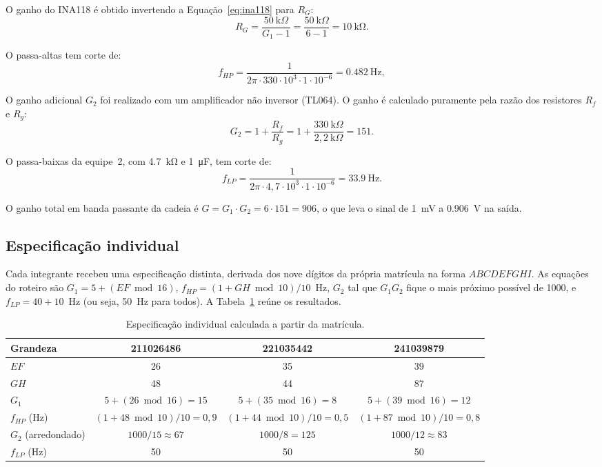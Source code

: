 \documentclass[11pt,a4paper]{article}
\begin{document}
O ganho do INA118 é obtido invertendo a Equação~\eqref{eq:ina118} para $R_G$:
\begin{equation}
R_G = \frac{50~\text{k}\Omega}{G_1 - 1} = \frac{50~\text{k}\Omega}{6 - 1} = \SI{10}{\kilo\ohm} .
\label{eq:rg_equipe}
\end{equation}

O passa-altas tem corte de:
\begin{equation}
f_{HP} = \frac{1}{2\pi \cdot 330 \cdot 10^3 \cdot 1 \cdot 10^{-6}} = \SI{0,482}{\hertz} ,
\label{eq:fhp_equipe}
\end{equation}

O ganho adicional $G_2$ foi realizado com um amplificador não inversor (TL064). O ganho é calculado puramente pela razão dos resistores $R_f$ e $R_g$:
\begin{equation}
G_2 = 1 + \frac{R_f}{R_g} = 1 + \frac{330~\text{k}\Omega}{2{,}2~\text{k}\Omega} = 151 .
\label{eq:g2_equipe}
\end{equation}

O passa-baixas da equipe~2, com \SI{4,7}{\kilo\ohm} e \SI{1}{\micro\farad}, tem corte de:
\begin{equation}
f_{LP} = \frac{1}{2\pi \cdot 4{,}7 \cdot 10^3 \cdot 1 \cdot 10^{-6}} = \SI{33,9}{\hertz} .
\label{eq:flp_equipe}
\end{equation}

O ganho total em banda passante da cadeia é $G = G_1 \cdot G_2 = 6 \cdot 151 = 906$, o que leva o sinal de \SI{1}{\milli\volt} a \SI{0,906}{\volt} na saída.

\subsection{Especificação individual}

Cada integrante recebeu uma especificação distinta, derivada dos nove dígitos da própria matrícula na forma $ABCDEFGHI$. As equações do roteiro são $G_1 = 5 + (EF \bmod 16)$, $f_{HP} = (1 + GH \bmod 10)/10$~Hz, $G_2$ tal que $G_1 G_2$ fique o mais próximo possível de 1000, e $f_{LP} = 40 + 10$~Hz (ou seja, \SI{50}{\hertz} para todos). A Tabela~\ref{tab:individual_r4} reúne os resultados.

\begin{table}[h]
\centering
\caption{Especificação individual calculada a partir da matrícula.}
\label{tab:individual_r4}
\begin{tabular}{lccc}
\hline
Grandeza & 211026486 & 221035442 & 241039879 \\
\hline
$EF$ & 26 & 35 & 39 \\
$GH$ & 48 & 44 & 87 \\
$G_1$ & $5 + (26 \bmod 16) = 15$ & $5 + (35 \bmod 16) = 8$ & $5 + (39 \bmod 16) = 12$ \\
$f_{HP}$ (\si{\hertz}) & $(1 + 48 \bmod 10)/10 = 0{,}9$ & $(1 + 44 \bmod 10)/10 = 0{,}5$ & $(1 + 87 \bmod 10)/10 = 0{,}8$ \\
$G_2$ (arredondado) & $1000/15 \approx 67$ & $1000/8 = 125$ & $1000/12 \approx 83$ \\
$f_{LP}$ (\si{\hertz}) & 50 & 50 & 50 \\
\hline
\end{tabular}
\end{table}
\end{document}
